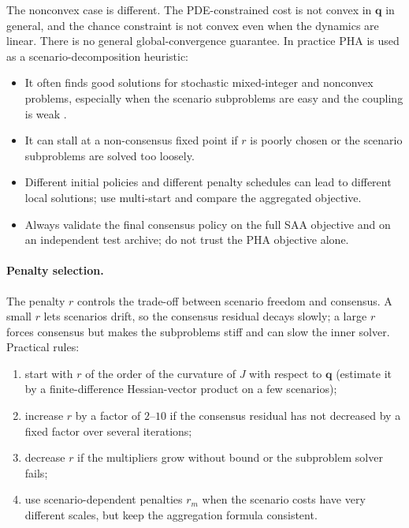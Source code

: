 \documentclass[11pt]{article}
\numberwithin{equation}{section}
\newcommand{\qq}{\mathbf{q}}
\theoremstyle{plain}
\begin{document}
The nonconvex case is different.  The PDE-constrained cost is not convex in
$\qq$ in general, and the chance constraint is not convex even when the
dynamics are linear.  There is no general global-convergence guarantee.  In
practice PHA is used as a scenario-decomposition heuristic:
\begin{itemize}[leftmargin=1.6em,itemsep=2pt]
  \item It often finds good solutions for stochastic mixed-integer and
        nonconvex problems, especially when the scenario subproblems are
        easy and the coupling is weak \citep{watson2011}.
  \item It can stall at a non-consensus fixed point if $r$ is poorly chosen or
        the scenario subproblems are solved too loosely.
  \item Different initial policies and different penalty schedules can lead to
        different local solutions; use multi-start and compare the aggregated
        objective.
  \item Always validate the final consensus policy on the full SAA objective
        and on an independent test archive; do not trust the PHA objective
        alone.
\end{itemize}

\paragraph{Penalty selection.}
The penalty $r$ controls the trade-off between scenario freedom and consensus.
A small $r$ lets scenarios drift, so the consensus residual decays slowly; a
large $r$ forces consensus but makes the subproblems stiff and can slow the
inner solver.  Practical rules:
\begin{enumerate}[leftmargin=1.6em,itemsep=2pt]
  \item start with $r$ of the order of the curvature of $J$ with respect to
        $\qq$ (estimate it by a finite-difference Hessian-vector product on a
        few scenarios);
  \item increase $r$ by a factor of $2$--$10$ if the consensus residual has
        not decreased by a fixed factor over several iterations;
  \item decrease $r$ if the multipliers grow without bound or the subproblem
        solver fails;
  \item use scenario-dependent penalties $r_m$ when the scenario costs have
        very different scales, but keep the aggregation formula consistent.
\end{enumerate}
\end{document}
